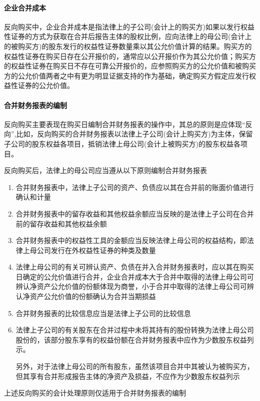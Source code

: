 \documentclass[UTF8,12pt]{ctexart}
\numberwithin{equation}{section} %
\numberwithin{figure}{section}
\numberwithin{table}{section}
\begin{document}
	\paragraph{企业合并成本}
	反向购买中，企业合并成本是指法律上的子公司(会计上的购买方)如果以发行权益性证券的方式为获取在合并后报告主体的股权比例，应向法律上的母公司(会计上的被购买方)的股东发行的权益性证券数量乘以其公允价值计算的结果。购买方的权益性证券在购买日存在公开报价的，通常应以公开报价作为其公允价值；购买方的权益性证券在购买日不存在可靠公开报价的，应参照购买方的公允价值和被购买方的公允价值两者之中有更为明显证据支持的作为基础，确定购买方假定应发行权益性证券的公允价值。
	
	\paragraph{合并财务报表的编制}
	反向购买主要表现在购买日编制合并财务报表的操作中，其总的原则是应体现“反向”,比如，反向购买的合并财务报表以法律上子公司(会计上购买方)为主体，保留子公司的股东权益各项目，抵销法律上母公司(会计上被购买方)的股东权益各项目。
	
	反向购买后，法律上的母公司应当遵从以下原则编制合并财务报表
	\begin{enumerate}
		\item 合并财务报表中，法律上子公司的资产、负债应以其在合并前的账面价值进行确认和计量
		
		\item 合并财务报表中的留存收益和其他权益余额应当反映的是法律上子公司在合并前的留存收益和其他权益余额
		
		\item 合并财务报表中的权益性工具的金额应当反映法律上母公司的权益结构，即法律上母公司发行在外权益性证券的种类及数量
		
		\item 法律上母公司的有关可辨认资产、负债在并入合并财务报表时，应以其在购买日确定的公允价值进行合并，企业合并成本大于合并中取得的法律上母公司可辨认净资产公允价值的份额体现为商誉，小于合并中取得的法律上母公司可辨认净资产公允价值的份额确认为合并当期损益
		
		\item 合并财务报表的比较信息应当是法律上子公司的比较信息
		
		\item 法律上子公司的有关股东在合并过程中未将其持有的股份转换为法律上母公司股份的，该部分股东享有的权益份额在合并财务报表中应作为少数股东权益列示。
		
		另外，对于法律上母公司的所有股东，虽然该项目合并中其被认为被购买方，但其享有合并形成报告主体的净资产及损益，不应作为少数股东权益列示
	\end{enumerate}
	上述反向购买的会计处理原则仅适用于合并财务报表的编制
	
\end{document}
